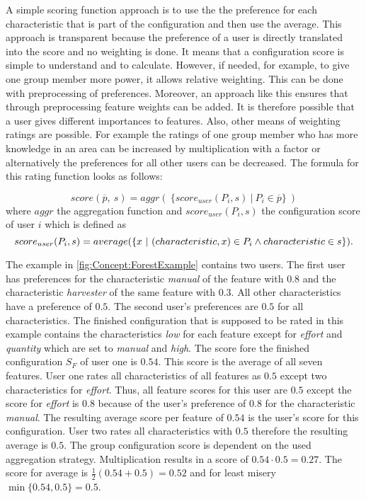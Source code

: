 A simple scoring function approach is to use the the preference for each characteristic that is part of the configuration and then use the average. This approach is transparent because the preference of a user is directly translated into the score and no weighting is done. It means that a configuration score is simple to understand and to calculate. However, if needed, for example, to give one group member more power, it allows relative weighting. This can be done with preprocessing of preferences. Moreover, an approach like this ensures that through preprocessing feature weights can be added. It is therefore possible that a user gives different importances to features. Also, other means of weighting ratings are possible. For example the ratings of one group member who has more knowledge in an area can be increased by multiplication with a factor or alternatively the preferences for all other users can be decreased.
The formula for this rating function looks as follows:

\begin{equation}
    score(\overline{p},\ s) = aggr( \ \{score_{user}(P_i, s) \ | \ P_i \in \overline{p} \} \ )
\end{equation}
where $aggr$ the aggregation function and $score_{user}(P_i, s)$ the configuration score of user $i$ which is defined as
\begin{equation}
    score_{user}(P_i, s) = average(\{x \ | \ (characteristic, x) \in P_i \land characteristic \in s \}) \notag . 
\end{equation}

The example in \autoref{fig:Concept:ForestExample} contains two users. The first user has preferences for the characteristic \emph{manual} of the feature with $0.8$ and the characteristic \emph{harvester} of the same feature with $0.3$. All other characteristics have a preference of $0.5$. The second user's preferences are $0.5$ for all characteristics. The finished configuration that is supposed to be rated in this example contains the characteristics \emph{low} for each feature except for \emph{effort} and \emph{quantity} which are set to \emph{manual} and \emph{high}. The score fore the finished configuration $S_F$ of user one is $0.54$. This score is the average of all seven features. User one rates all characteristics of all features as $0.5$ except two characteristics for \emph{effort}. Thus, all feature scores for this user are $0.5$ except the score for \emph{effort} is $0.8$ because of the user's preference of $0.8$ for the characteristic \emph{manual}. The resulting average score per feature of $0.54$ is the user's score for this configuration. User two rates all characteristics with $0.5$ therefore the resulting average is $0.5$.
The group configuration score is dependent on the used aggregation strategy. Multiplication results in a score of $0.54 \cdot 0.5 = 0.27$. The score for average is $\frac{1}{2}(0.54 + 0.5) = 0.52$ and for least misery $\min \{0.54, 0.5\} = 0.5$.

